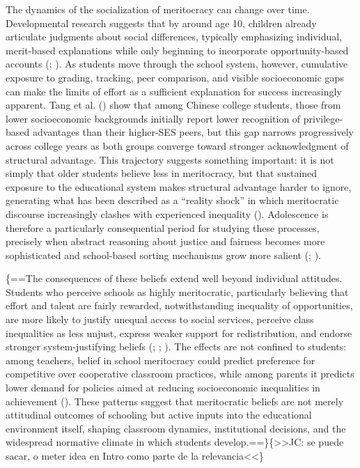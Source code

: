 \documentclass[
  13pt,
]{article}
\begin{document}
The dynamics of the socialization of meritocracy can change over time.
Developmental research suggests that by around age 10, children already
articulate judgments about social differences, typically emphasizing
individual, merit-based explanations while only beginning to incorporate
opportunity-based accounts (; ).
As students move through the school system, however, cumulative exposure
to grading, tracking, peer comparison, and visible socioeconomic gaps
can make the limits of effort as a sufficient explanation for success
increasingly apparent. Tang et al.
() show that among Chinese
college students, those from lower socioeconomic backgrounds initially
report lower recognition of privilege-based advantages than their
higher-SES peers, but this gap narrows progressively across college
years as both groups converge toward stronger acknowledgment of
structural advantage. This trajectory suggests something important: it
is not simply that older students believe less in meritocracy, but that
sustained exposure to the educational system makes structural advantage
harder to ignore, generating what has been described as a ``reality
shock'' in which meritocratic discourse increasingly clashes with
experienced inequality ().
Adolescence is therefore a particularly consequential period for
studying these processes, precisely when abstract reasoning about
justice and fairness becomes more sophisticated and school-based sorting
mechanisms grow more salient
(;
).

\{==The consequences of these beliefs extend well beyond individual
attitudes. Students who perceive schools as highly meritocratic,
particularly believing that effort and talent are fairly rewarded,
notwithstanding inequality of opportunities, are more likely to justify
unequal access to social services, perceive class inequalities as less
unjust, express weaker support for redistribution, and endorse stronger
system-justifying beliefs (; ; ).
The effects are not confined to students: among teachers, belief in
school meritocracy could predict preference for competitive over
cooperative classroom practices, while among parents it predicts lower
demand for policies aimed at reducing socioeconomic inequalities in
achievement (). These patterns suggest that meritocratic beliefs are not merely
attitudinal outcomes of schooling but active inputs into the educational
environment itself, shaping classroom dynamics, institutional decisions,
and the widespread normative climate in which students
develop.==\}\{\textgreater\textgreater JC: se puede sacar, o meter idea
en Intro como parte de la relevancia\textless\textless\}
\end{document}
